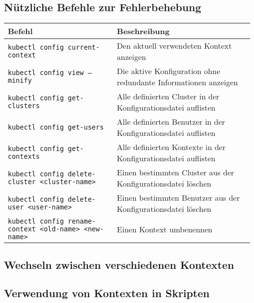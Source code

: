\subsection{Nützliche Befehle zur Fehlerbehebung}
\begin{tabular}{|p{}|p{}|}
\hline
\textbf{Befehl} & \textbf{Beschreibung} \\
\hline
\texttt{kubectl config current-context} & Den aktuell verwendeten Kontext anzeigen \\
\texttt{kubectl config view --minify} & Die aktive Konfiguration ohne redundante Informationen anzeigen \\
\texttt{kubectl config get-clusters} & Alle definierten Cluster in der Konfigurationsdatei auflisten \\
\texttt{kubectl config get-users} & Alle definierten Benutzer in der Konfigurationsdatei auflisten \\
\texttt{kubectl config get-contexts} & Alle definierten Kontexte in der Konfigurationsdatei auflisten \\
\texttt{kubectl config delete-cluster <cluster-name>} & Einen bestimmten Cluster aus der Konfigurationsdatei löschen \\
\texttt{kubectl config delete-user <user-name>} & Einen bestimmten Benutzer aus der Konfigurationsdatei löschen \\
\texttt{kubectl config rename-context <old-name> <new-name>} & Einen Kontext umbenennen \\
\hline
\end{tabular}

\subsection{Wechseln zwischen verschiedenen Kontexten}


\subsection{Verwendung von Kontexten in Skripten}
